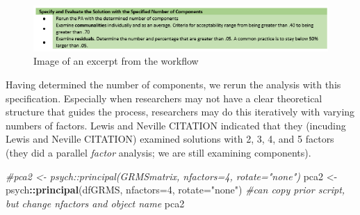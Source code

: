 \documentclass[
  english,
]{book}
\newenvironment{Shaded}{\begin{snugshade}}{\end{snugshade}}
\newcommand{\CommentTok}[1]{\textcolor[rgb]{0.56,0.35,0.01}{\textit{#1}}}
\newcommand{\DataTypeTok}[1]{\textcolor[rgb]{0.13,0.29,0.53}{#1}}
\newcommand{\DecValTok}[1]{\textcolor[rgb]{0.00,0.00,0.81}{#1}}
\newcommand{\KeywordTok}[1]{\textcolor[rgb]{0.13,0.29,0.53}{\textbf{#1}}}
\newcommand{\NormalTok}[1]{#1}
\newcommand{\OperatorTok}[1]{\textcolor[rgb]{0.81,0.36,0.00}{\textbf{#1}}}
\newcommand{\StringTok}[1]{\textcolor[rgb]{0.31,0.60,0.02}{#1}}
\begin{document}
\begin{figure}
\centering
\includegraphics{images/PCA/SpecifyCompNum.png}
\caption{Image of an excerpt from the workflow}
\end{figure}

Having determined the number of components, we rerun the analysis with this specification. Especially when researchers may not have a clear theoretical structure that guides the process, researchers may do this iteratively with varying numbers of factors. Lewis and Neville CITATION indicated that they (incuding Lewis and Neville CITATION) examined solutions with 2, 3, 4, and 5 factors (they did a parallel \emph{factor} analysis; we are still examining components).

\begin{Shaded}
\begin{Highlighting}[]
\CommentTok{#pca2 <- psych::principal(GRMSmatrix, nfactors=4, rotate="none")}
\NormalTok{pca2 <-}\StringTok{ }\NormalTok{psych}\OperatorTok{::}\KeywordTok{principal}\NormalTok{(dfGRMS, }\DataTypeTok{nfactors=}\DecValTok{4}\NormalTok{, }\DataTypeTok{rotate=}\StringTok{"none"}\NormalTok{) }\CommentTok{#can copy prior script, but change nfactors and object name}
\NormalTok{pca2}
\end{Highlighting}
\end{Shaded}
\end{document}
